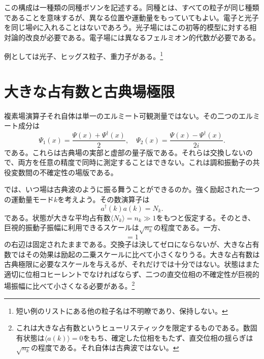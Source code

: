 この構成は一種類の同種ボソンを記述する。同種とは、すべての粒子が同じ種類であることを意味するが、異なる位置や運動量をもっていてもよい。電子と光子を同じ場\(\Psi\)に入れることはないであろう。光子場にはこの初等的模型に対する相対論的改良が必要である。電子場には異なるフェルミオン的代数が必要である。

\begin{classroomqa}
\end{classroomqa}


例としては光子、ヒッグス粒子、重力子がある。\footnote{短い例のリストにある他の粒子名は不明瞭であり、保持しない。}

\section{大きな占有数と古典場極限}

複素場演算子それ自体は単一のエルミート可観測量ではない。その二つのエルミート成分は
\begin{equation}
\Psi_1(x)=\frac{\Psi(x)+\Psi^\dagger(x)}{2},
\quad
\Psi_2(x)=\frac{\Psi(x)-\Psi^\dagger(x)}{2i}.
\end{equation}
である。これらは古典場の実部と虚部の量子版である。それらは交換しないので、両方を任意の精度で同時に測定することはできない。これは調和振動子の共役変数間の不確定性の場版である。

では、いつ場は古典波のように振る舞うことができるのか。強く励起された一つの運動量モード\(k\)を考えよう。その数演算子は
\begin{equation}
a^\dagger(k)a(k)=N_k.
\end{equation}
である。状態が大きな平均占有数\(\langle N_k\rangle=n_k\gg 1\)をもつと仮定する。そのとき、巨視的振動子振幅に利用できるスケールは\(\sqrt{n_k}\)の程度である。一方、
\begin{equation}
[a(k),a^\dagger(k)]=1
\end{equation}
の右辺は固定されたままである。交換子は決してゼロにならないが、大きな占有数ではその効果は励起の二乗スケールに比べて小さくなりうる。大きな占有数は古典極限に必要なスケールを与えるが、それだけでは十分ではない。状態はまた適切に位相コヒーレントでなければならず、二つの直交位相の不確定性が巨視的場振幅に比べて小さくなる必要がある。\footnote{これは大きな占有数というヒューリスティックを限定するものである。数固有状態は\(\langle a(k)\rangle=0\)をもち、確定した位相をもたず、直交位相の揺らぎは\(\sqrt{n_k}\)の程度である。それ自体は古典波ではない。}

